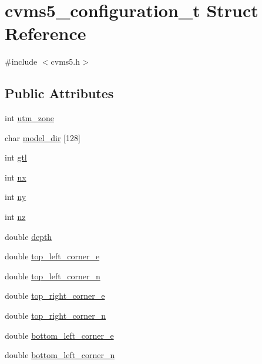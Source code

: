 \hypertarget{structcvms5__configuration__t}{\section{cvms5\+\_\+configuration\+\_\+t Struct Reference}
\label{structcvms5__configuration__t}
}


{\ttfamily \#include $<$cvms5.\+h$>$}

\subsection*{Public Attributes}
\begin{DoxyCompactItemize}
\item 
int \hyperlink{structcvms5__configuration__t_aad2dc7f494a213abbc4f173a498cffbf}{utm\+\_\+zone}
\item 
char \hyperlink{structcvms5__configuration__t_a92a1ccf6542c373b598a7a83251c4eb7}{model\+\_\+dir} \mbox{[}128\mbox{]}
\item 
int \hyperlink{structcvms5__configuration__t_a8fef888b1572b763843fff7a07a29a2e}{gtl}
\item 
int \hyperlink{structcvms5__configuration__t_a339993ef6d21ce0efa803d6d5e4c2520}{nx}
\item 
int \hyperlink{structcvms5__configuration__t_a7cfe5f850c6d6aa2243cac781fe59e06}{ny}
\item 
int \hyperlink{structcvms5__configuration__t_a1c3984786f10c8851ce7e29eec6ab154}{nz}
\item 
double \hyperlink{structcvms5__configuration__t_ae06d0ad6271283e4ffeea1bc7d81f0f9}{depth}
\item 
double \hyperlink{structcvms5__configuration__t_a972f0043de07521ed4334cee27505390}{top\+\_\+left\+\_\+corner\+\_\+e}
\item 
double \hyperlink{structcvms5__configuration__t_a4f3476d91bed8bc9d4b36838d5f40053}{top\+\_\+left\+\_\+corner\+\_\+n}
\item 
double \hyperlink{structcvms5__configuration__t_aaac7648dfa75759896e58efaaba005cb}{top\+\_\+right\+\_\+corner\+\_\+e}
\item 
double \hyperlink{structcvms5__configuration__t_ae9209d39f78932c177affef1b738adf5}{top\+\_\+right\+\_\+corner\+\_\+n}
\item 
double \hyperlink{structcvms5__configuration__t_a39071d1d92dee66ac048d7391c615fa5}{bottom\+\_\+left\+\_\+corner\+\_\+e}
\item 
double \hyperlink{structcvms5__configuration__t_a7898366bb41ef2badcb9bb2fe97a5c1c}{bottom\+\_\+left\+\_\+corner\+\_\+n}

\end{DoxyCompactItemize}
